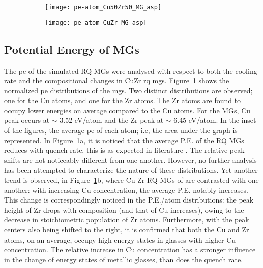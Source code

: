 \begin{figure} %
	\centering
	\begin{subfigure}{\linewidth} \centering
		\texttt{[image: pe-atom\_Cu50Zr50\_MG\_asp]}
	\end{subfigure}%
	\vfill
	\begin{subfigure}{\linewidth} \centering
		\texttt{[image: pe-atom\_CuZr\_MG\_asp]}
	\end{subfigure}	
	\label{f:pe_mgs}
\end{figure}

\subsection{Potential Energy of MGs}  \label{s:pe-mgs}
The \gls{pe} of the simulated RQ MGs were analysed with respect to both the cooling rate and the compositional changes in CuZr \gls{rq} \gls{mg}s. Figure~\ref{f:pe_mgs} shows the normalized \gls{pe} distributions of the \gls{mg}s. Two distinct distributions are observed; one for the Cu atoms, and one for the Zr atoms. The Zr atoms are found to occupy lower energies on average compared to the Cu atoms. For the \cz  {} MGs, Cu peak occurs at $\sim$-3.52 eV/atom and the Zr peak at $\sim$-6.45 eV/atom. In the inset of the figures, the average \gls{pe} of each atom; i.e, the area under the graph is represented. In Figure~\ref{f:pe_mgs}a, it is noticed that the average P.E. of the RQ MGs reduces with quench rate, this is as expected in literature \cite{Yue2018,Berthier2016}. The relative peak shifts are not noticeably different from one another. However, no further analysis has been attempted to characterize the nature of these distributions. Yet another trend is observed, in Figure~\ref{f:pe_mgs}b, where Cu-Zr RQ MGs of  are contrasted with one another: with increasing Cu concentration, the average P.E. notably increases. This change is correspondingly noticed in the P.E./atom distributions: the peak height of Zr drops with composition (and that of Cu increases), owing to the decrease in stoichiometric population of Zr atoms. Furthermore, with the peak centers also being shifted to the right, it is confirmed that both the Cu and Zr atoms, on an average, occupy high energy states in glasses with higher Cu concentration. The relative increase in Cu concentration has a stronger influence in the change of energy states of metallic glasses, than does the quench rate. \par

